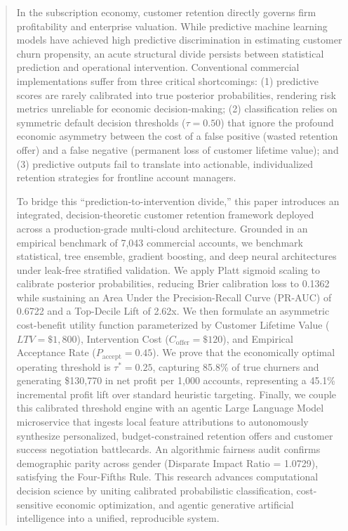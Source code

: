 \documentclass[journal,compsoc]{IEEEtran}
\begin{document}
\begin{abstract}
In the subscription economy, customer retention directly governs firm profitability and enterprise valuation. While predictive machine learning models have achieved high predictive discrimination in estimating customer churn propensity, an acute structural divide persists between statistical prediction and operational intervention. Conventional commercial implementations suffer from three critical shortcomings: (1) predictive scores are rarely calibrated into true posterior probabilities, rendering risk metrics unreliable for economic decision-making; (2) classification relies on symmetric default decision thresholds ($\tau = 0.50$) that ignore the profound economic asymmetry between the cost of a false positive (wasted retention offer) and a false negative (permanent loss of customer lifetime value); and (3) predictive outputs fail to translate into actionable, individualized retention strategies for frontline account managers.

To bridge this ``prediction-to-intervention divide,'' this paper introduces an integrated, decision-theoretic customer retention framework deployed across a production-grade multi-cloud architecture. Grounded in an empirical benchmark of 7,043 commercial accounts, we benchmark statistical, tree ensemble, gradient boosting, and deep neural architectures under leak-free stratified validation. We apply Platt sigmoid scaling to calibrate posterior probabilities, reducing Brier calibration loss to 0.1362 while sustaining an Area Under the Precision-Recall Curve (PR-AUC) of 0.6722 and a Top-Decile Lift of 2.62x. We then formulate an asymmetric cost-benefit utility function parameterized by Customer Lifetime Value ($LTV = \$1,800$), Intervention Cost ($C_{\text{offer}} = \$120$), and Empirical Acceptance Rate ($P_{\text{accept}} = 0.45$). We prove that the economically optimal operating threshold is $\tau^* = 0.25$, capturing 85.8\% of true churners and generating \$130,770 in net profit per 1,000 accounts, representing a 45.1\% incremental profit lift over standard heuristic targeting. Finally, we couple this calibrated threshold engine with an agentic Large Language Model microservice that ingests local feature attributions to autonomously synthesize personalized, budget-constrained retention offers and customer success negotiation battlecards. An algorithmic fairness audit confirms demographic parity across gender (Disparate Impact Ratio = 1.0729), satisfying the Four-Fifths Rule. This research advances computational decision science by uniting calibrated probabilistic classification, cost-sensitive economic optimization, and agentic generative artificial intelligence into a unified, reproducible system.
\end{abstract}
\end{document}

